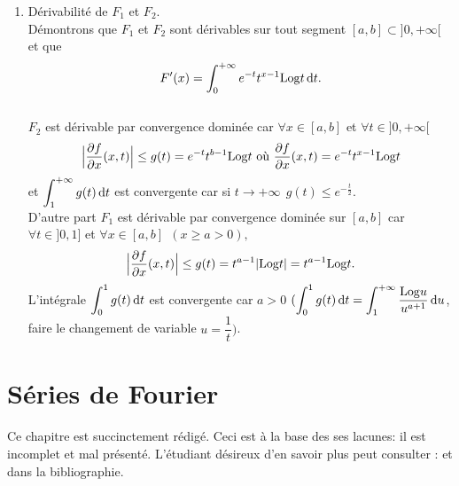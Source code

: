 \documentclass[11pt, a4paper]{book}
\begin{document}
\begin{enumerate}
$F_2$ est aussi continue par convergence domin\'ee sur $[a,b]$ car $e^{-t}\cdot t^{x-1}\leq e^{-t}\cdot t^{b-1}=g(t)\quad\forall x\in [a,b]$ et $t\in [1,+\infty[$ et ${\displaystyle \int_1^{+\infty}e^{-t}t^{b-1}\,\ud t}$ est convergente car si $t\rightarrow +\infty \quad e^{-t}\cdot t^{b-1}\leq e^{-\frac{t}{2}}$. \\
$F_1$ et $F_2$ sont continues sur tout segment $[a,b]\subset ]0,+\infty[.$ En particulier en tout point de $]0,+\infty[.$
\item D\'erivabilit\'e de $F_1$ et $F_2$.\\
D\'emontrons que $F_1$ et $F_2$ sont d\'erivables sur tout segment $[a,b]\subset]0,+\infty[$ et que $${\displaystyle F'(x)=\int_0^{+\infty}e^{-t}t^{x-1}\mathrm{Log} t\,\mathrm{d} t}.$$ \\
$F_2$ est d\'erivable par convergence domin\'ee car $ \forall x\in [a,b]$ et $\forall t\in ]0,+\infty[ $ 
$$ \Big|\dfrac{\partial f}{\partial x}(x,t)\Big|\leq g(t)=e^{-t}t^{b-1}\mathrm{Log} t~\text{o\`u}~ \dfrac{\partial f}{\partial x}(x,t)=e^{-t}t^{x-1}\mathrm{Log} t$$ et ${\displaystyle \int_1^{+\infty}g(t)\,\mathrm{d} t}$ est convergente car si $t\rightarrow+\infty~~g(t)\leq e^{-\frac{t}{2}}.$\\
D'autre part $F_1$ est d\'erivable par convergence domin\'ee sur $[a,b]$ car $\forall t\in ]0,1]$ et $\forall x\in [a,b]~~(x\geq a>0),$  $$\Big|\dfrac{\partial f}{\partial x}(x,t)\Big|\leq g(t)=t^{a-1}|\mathrm{Log} t|=t^{a-1}\mathrm{Log} t.$$
L'int\'egrale ${\displaystyle \int_0^1g(t)\,\mathrm{d} t}$ est convergente car $a>0$ $({\displaystyle \int_0^1g(t)\,\mathrm{d} t=\int_1^{+\infty}\dfrac{\mathrm{Log} u}{u^{a+1}}\,\mathrm{d} u}$, faire le changement de variable $u=\dfrac{1}{t})$.
\end{enumerate}


\chapter{S\'eries de Fourier}
Ce chapitre est succinctement r\'edig\'e. Ceci est \`a la base des ses lacunes: il est incomplet et mal pr\'esent\'e. L'\'etudiant d\'esireux d'en savoir plus peut consulter : \cite{kre} et \cite{lelong} dans la bibliographie.
\end{document}
